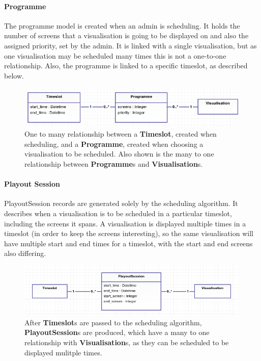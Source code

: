 \documentclass[a4paper, titlepage]{article}
\begin{document}
\paragraph{Programme}
The programme model is created when an admin is scheduling. It holds the number of screens that a 
visualisation is going to be displayed on and also the assigned priority, set by the admin. It is linked
with a single visualisation, but as one visualisation may be scheduled many times this is not a 
one-to-one relationship. Also, the programme is linked to a specific timeslot, as described below.

\begin{figure}[h!]
  \centering
    \includegraphics[width = 0.99\textwidth]{./relations/timeslot-programme-vis.png}
  \caption{One to many relationship between a \textbf{Timeslot}, created when scheduling, and a 
  			\textbf{Programme}, created when choosing a visualisation to be scheduled. Also shown is 
  			the many to one relationship between \textbf{Programme}s and \textbf{Visualisation}s.}
  \label{fig:rel-timeslot-programme-vis}
\end{figure}






\paragraph{Playout Session}
PlayoutSession records are generated solely by the scheduling algorithm. It describes when a 
visualisation is to be scheduled in a particular timeslot, including the screens it spans. A 
visualisation is displayed multiple times in a timeslot (in order to keep the screens interesting),
so the same visualisation will have multiple start and end times for a timeslot, with the start and
end screens also differing.

\begin{figure}[h!]
  \centering
    \includegraphics[width = 0.99\textwidth]{./relations/timeslot-ps-vis.png}
  \caption{After \textbf{Timeslot}s are passed to the scheduling algorithm, \textbf{PlayoutSession}s 
  			are produced, which have a many to one relationship with \textbf{Visualisation}s, as they
  			can be scheduled to be displayed mulitple times.}
  \label{fig:rel-timeslot-ps-vis}
\end{figure}
\end{document}
